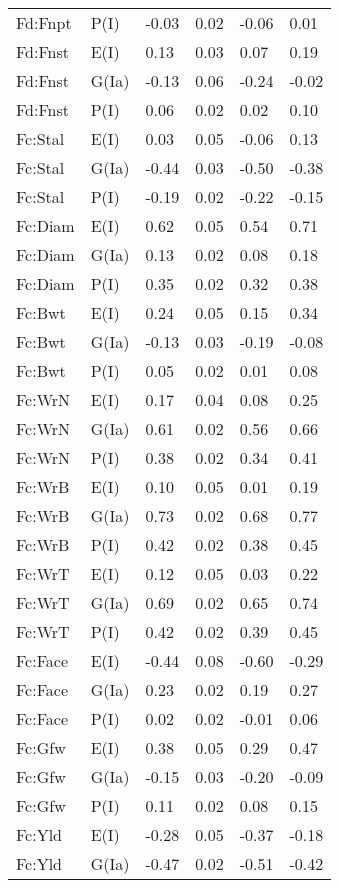 \begin{center}
\begin{longtable}{|p{1.1in}|p{0.7in}|p{0.7in}|p{0.6in}|p{0.6in}|p{0.6in}|}
  Fd:Fnpt & P(I) & -0.03 & 0.02 & -0.06 & 0.01 \\ 
  Fd:Fnst & E(I) & 0.13 & 0.03 & 0.07 & 0.19 \\ 
  Fd:Fnst & G(Ia) & -0.13 & 0.06 & -0.24 & -0.02 \\ 
  Fd:Fnst & P(I) & 0.06 & 0.02 & 0.02 & 0.10 \\ 
  Fc:Stal & E(I) & 0.03 & 0.05 & -0.06 & 0.13 \\ 
  Fc:Stal & G(Ia) & -0.44 & 0.03 & -0.50 & -0.38 \\ 
  Fc:Stal & P(I) & -0.19 & 0.02 & -0.22 & -0.15 \\ 
  Fc:Diam & E(I) & 0.62 & 0.05 & 0.54 & 0.71 \\ 
  Fc:Diam & G(Ia) & 0.13 & 0.02 & 0.08 & 0.18 \\ 
  Fc:Diam & P(I) & 0.35 & 0.02 & 0.32 & 0.38 \\ 
  Fc:Bwt & E(I) & 0.24 & 0.05 & 0.15 & 0.34 \\ 
  Fc:Bwt & G(Ia) & -0.13 & 0.03 & -0.19 & -0.08 \\ 
  Fc:Bwt & P(I) & 0.05 & 0.02 & 0.01 & 0.08 \\ 
  Fc:WrN & E(I) & 0.17 & 0.04 & 0.08 & 0.25 \\ 
  Fc:WrN & G(Ia) & 0.61 & 0.02 & 0.56 & 0.66 \\ 
  Fc:WrN & P(I) & 0.38 & 0.02 & 0.34 & 0.41 \\ 
  Fc:WrB & E(I) & 0.10 & 0.05 & 0.01 & 0.19 \\ 
  Fc:WrB & G(Ia) & 0.73 & 0.02 & 0.68 & 0.77 \\ 
  Fc:WrB & P(I) & 0.42 & 0.02 & 0.38 & 0.45 \\ 
  Fc:WrT & E(I) & 0.12 & 0.05 & 0.03 & 0.22 \\ 
  Fc:WrT & G(Ia) & 0.69 & 0.02 & 0.65 & 0.74 \\ 
  Fc:WrT & P(I) & 0.42 & 0.02 & 0.39 & 0.45 \\ 
  Fc:Face & E(I) & -0.44 & 0.08 & -0.60 & -0.29 \\ 
  Fc:Face & G(Ia) & 0.23 & 0.02 & 0.19 & 0.27 \\ 
  Fc:Face & P(I) & 0.02 & 0.02 & -0.01 & 0.06 \\ 
  Fc:Gfw & E(I) & 0.38 & 0.05 & 0.29 & 0.47 \\ 
  Fc:Gfw & G(Ia) & -0.15 & 0.03 & -0.20 & -0.09 \\ 
  Fc:Gfw & P(I) & 0.11 & 0.02 & 0.08 & 0.15 \\ 
  Fc:Yld & E(I) & -0.28 & 0.05 & -0.37 & -0.18 \\ 
  Fc:Yld & G(Ia) & -0.47 & 0.02 & -0.51 & -0.42 \\ 

\end{longtable}
\end{center}
